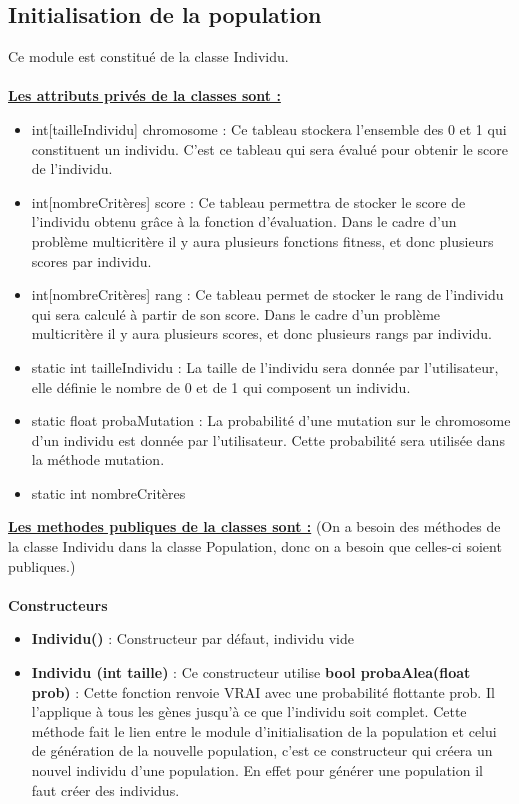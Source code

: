 \documentclass[a4paper,11pt]{article}
\begin{document}
		\subsection{Initialisation de la population}
			Ce module est constitué de la classe Individu.\\
			\\
			\underline{\bf Les attributs privés de la classes sont :}\\
				\begin{itemize}
				\item int[tailleIndividu] chromosome : Ce tableau stockera l’ensemble des 0 et 1 qui constituent un individu. C’est ce tableau qui sera évalué pour obtenir le score de l’individu.
				\item int[nombreCritères] score : Ce tableau permettra de stocker le score de l’individu obtenu grâce à la fonction d’évaluation. 
													Dans le cadre d’un problème multicritère il y aura plusieurs fonctions fitness, et donc plusieurs scores par individu.
				\item int[nombreCritères] rang : Ce tableau permet de stocker le rang de l’individu qui sera calculé à partir de son score. 
													Dans le cadre d’un problème multicritère il y aura plusieurs scores, et donc plusieurs rangs par individu. 
				\item static int tailleIndividu : La taille de l’individu sera donnée par l’utilisateur, elle définie le nombre de 0 et de 1 qui composent un individu.
				\item static float probaMutation : La probabilité d’une mutation sur le chromosome d’un individu est donnée par l’utilisateur. Cette probabilité sera utilisée dans la méthode mutation.
				\item static int nombreCritères\\
			\end{itemize}
			\underline{\bf Les methodes publiques de la classes sont :} (On a besoin des méthodes de la classe Individu dans la classe Population, donc on a besoin que celles-ci soient publiques.)\\\\
			\textbf{Constructeurs}
				\begin{itemize}
					\item \textbf{Individu()} : Constructeur par défaut, individu vide
					\item \textbf{Individu (int taille)} : Ce constructeur utilise \textbf{bool probaAlea(float prob)} : Cette fonction renvoie VRAI avec une probabilité flottante prob.
						Il l’applique à tous les gènes jusqu’à ce que l’individu soit complet.
						Cette méthode fait le lien entre le module d’initialisation de la population et celui de génération de la nouvelle population, c'est ce constructeur qui créera un nouvel individu d'une population. 
						En effet pour générer une population il faut créer des individus. \\
				\end{itemize}
\end{document}
